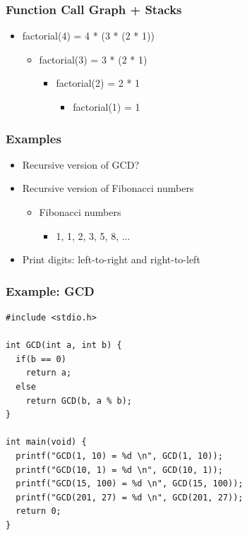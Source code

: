 \documentclass{../c-lecture}
\begin{document}
\begin{frame}
  \frametitle{Function Call Graph + Stacks}
  \begin{itemize}
    \item factorial(4) = 4 * (3 * (2 * 1))
    \begin{itemize}
      \item factorial(3) = 3 * (2 * 1)
      \begin{itemize}
        \item factorial(2) = 2 * 1
        \begin{itemize}
          \item factorial(1) = 1
        \end{itemize}
      \end{itemize}
    \end{itemize}
  \end{itemize}
\end{frame}

\begin{frame}
  \frametitle{Examples}
  \begin{itemize}
    \item Recursive version of GCD?
    \item Recursive version of Fibonacci numbers
    \begin{itemize}
      \item Fibonacci numbers
      \begin{itemize}
        \item 1, 1, 2, 3, 5, 8, ...
      \end{itemize}
    \end{itemize}
    \item Print digits: left-to-right and right-to-left
  \end{itemize}
\end{frame}

\begin{frame}
  \frametitle{Example: GCD}
  \begin{verbatim}
#include <stdio.h>

int GCD(int a, int b) {
  if(b == 0)
    return a;
  else
    return GCD(b, a % b);
}

int main(void) {
  printf("GCD(1, 10) = %d \n", GCD(1, 10));
  printf("GCD(10, 1) = %d \n", GCD(10, 1));
  printf("GCD(15, 100) = %d \n", GCD(15, 100));
  printf("GCD(201, 27) = %d \n", GCD(201, 27));
  return 0;
}
  \end{verbatim}
\end{frame}
\end{document}
